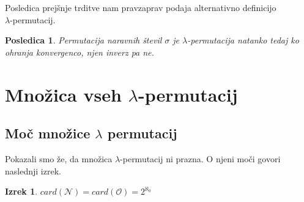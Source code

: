 \documentclass[12pt,a4paper,reqno]{amsart}
\theoremstyle{definition} %
\theoremstyle{plain} %
\newtheorem{izrek}[definicija]{Izrek}
\newtheorem{posledica}[definicija]{Posledica}
\begin{document}
Posledica prejšnje trditve nam pravzaprav podaja alternativno definicijo \\$\lambda$-permutacij.

\begin{posledica}
Permutacija naravnih števil $\sigma$ je $\lambda$-permutacija natanko tedaj ko ohranja konvergenco, njen inverz pa ne.
\end{posledica}

\section{Množica vseh $\lambda$-permutacij}

\subsection{Moč množice $\lambda$ permutacij}

Pokazali smo že, da množica $\lambda$-permutacij ni prazna.
O njeni moči govori naslednji izrek.

\begin{izrek}
$card(\mathcal{N})=card(\mathcal{O})=2^{\aleph_0}$
\end{izrek}
\end{document}
